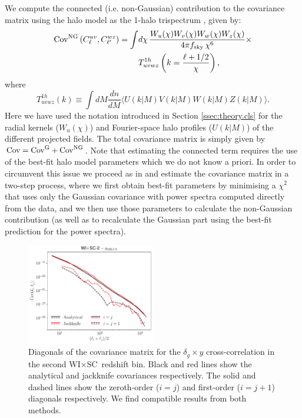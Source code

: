 \documentclass[useAMS,usenatbib]{mn2e}
\newcommand{\wisc}{WI$\times$SC}
\begin{document}
    We compute the connected (i.e. non-Gaussian) contribution to the covariance matrix using the halo model as the 1-halo trispectrum \citep{2002MNRAS.336.1256K}, given by:
    \begin{align}\nonumber
      {\rm Cov}^{\rm NG}\left(C^{uv}_\ell,C^{wz}_{\ell'}\right)=\int &d\chi\,\frac{W_u(\chi)W_v(\chi)W_w(\chi)W_z(\chi)}{4\pi f_{\rm sky}\,\chi^6}\times\\\label{eq:cov_ng}
      &T^{1h}_{uvwz}\left(k=\frac{\ell+1/2}{\chi}\right),
    \end{align}
    where
    \begin{equation}\nonumber
      T^{1h}_{uvwz}(k)\equiv\int dM\frac{dn}{dM}\langle U(k|M) V(k|M) W(k|M) Z(k|M)\rangle.
    \end{equation}
    Here we have used the notation introduced in Section \ref{ssec:theory.cls} for the radial kernels ($W_u(\chi)$) and Fourier-space halo profiles ($U(k|M)$) of the different projected fields. The total covariance matrix is simply given by ${\rm Cov}={\rm Cov}^{\rm G}+{\rm Cov}^{\rm NG}$. Note that estimating the connected term requires the use of the best-fit halo model parameters which we do not know a priori. In order to circumvent this issue we proceed as in \cite{2018MNRAS.473.4318A} and estimate the covariance matrix in a two-step process, where we first obtain best-fit parameters by minimising a $\chi^2$ that uses only the Gaussian covariance with power spectra computed directly from the data, and we then use those parameters to calculate the non-Gaussian contribution (as well as to recalculate the Gaussian part using the best-fit prediction for the power spectra).
    \begin{figure}
      \centering
      \includegraphics[width=0.5\textwidth]{cov_diag_wisc2.pdf}
      \caption{Diagonals of the covariance matrix for the $\delta_g\times y$ cross-correlation in the second \wisc~redshift bin. Black and red lines show the analytical and jackknife covariances respectively. The solid and dashed lines show the zeroth-order ($i=j$) and first-order ($i=j+1$) diagonals respectively. We find compatible results from both methods.}
      \label{fig:covdiag}
    \end{figure}
\end{document}
